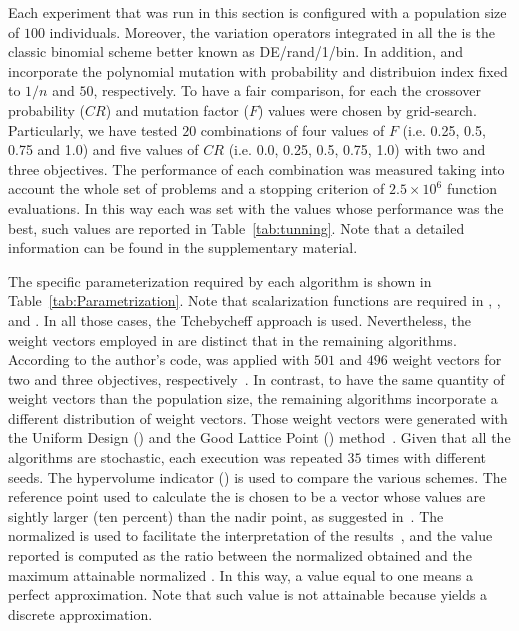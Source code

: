 Each experiment that was run in this section is configured with a population size of $100$ individuals.
%
Moreover, the variation operators integrated in all the \MOEAS{} is the classic binomial \DE{} scheme better known as DE/rand/1/bin.
%
In addition, \MOEAD{} and \VSDMOEAD{} incorporate the polynomial mutation with probability and distribuion index fixed to $1/n$ and $50$, respectively.
%
To have a fair comparison, for each \MOEA{} the crossover probability ($CR$) and mutation factor ($F$) values were chosen by grid-search.
%
Particularly, we have tested $20$ combinations of four values of $F$ (i.e. 0.25, 0.5, 0.75 and 1.0) and five values of $CR$ (i.e. 0.0, 0.25, 0.5, 0.75, 1.0) with two and three objectives.
%
The performance of each combination was measured taking into account the whole set of problems and a stopping criterion of  $2.5 \times 10^{6}$ function evaluations.
%
In this way each \MOEA{} was set with the values whose performance was the best, such values are reported in Table~\ref{tab:tunning}. Note that a detailed information can be found in the supplementary material.
%

%
The specific parameterization required by each algorithm is shown in Table~\ref{tab:Parametrization}.
%
Note that scalarization functions are required in \MOEADDE{}, \RMOEA{}, \NSGAIII{} and \VSDMOEAD{}.
%
In all those cases, the Tchebycheff approach is used.
%
Nevertheless, the weight vectors employed in \RMOEA{} are distinct that in the remaining algorithms.
%
According to the author's code, \RMOEA{} was applied with $501$ and $496$ weight vectors for two and three objectives, respectively~\cite{trautmann2013r2}.
%
In contrast, to have the same quantity of weight vectors than the population size, the remaining algorithms incorporate a different distribution of weight vectors.
%
Those weight vectors were generated with the Uniform Design (\UD{}) and the Good Lattice Point (\GLP{}) method~\cite{tan2013moea1, tan2013moea2}.
%
Given that all the algorithms are stochastic, each execution was repeated $35$ times with different seeds.
%
The hypervolume indicator (\HV{}) is used to compare the various schemes.
%
The reference point used to calculate the \HV{} is chosen to be a vector whose values are sightly larger (ten percent) than the nadir point, as suggested in~\cite{ishibuchi2017reference}.
%
The normalized \HV{} is used to facilitate the interpretation of the results~\cite{li2014evolutionary}, and the value reported is computed as the ratio between the normalized \HV{} obtained and the maximum attainable normalized \HV{}.
%
In this way, a value equal to one means a perfect approximation.
%
Note that such value is not attainable because \MOEAS{} yields a discrete approximation.
%

